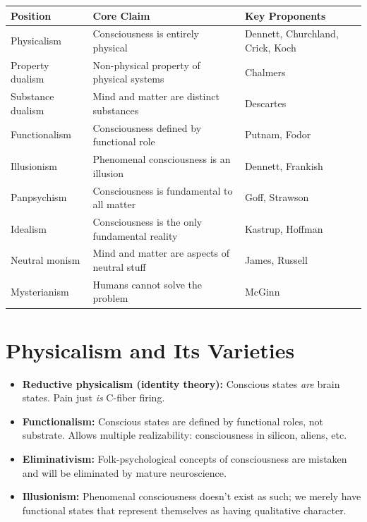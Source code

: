 \documentclass[11pt,a4paper]{report}
\begin{document}
\begin{center}
\renewcommand{\arraystretch}{1.3}
\begin{tabular}{>{\raggedright}p{3.5cm} >{\raggedright}p{4cm} >{\raggedright\arraybackslash}p{6cm}}
  \toprule
  \textbf{Position} & \textbf{Core Claim} & \textbf{Key Proponents} \\
  \midrule
  Physicalism & Consciousness is entirely physical & Dennett, Churchland, Crick, Koch \\
  Property dualism & Non-physical property of physical systems & Chalmers \\
  Substance dualism & Mind and matter are distinct substances & Descartes \\
  Functionalism & Consciousness defined by functional role & Putnam, Fodor \\
  Illusionism & Phenomenal consciousness is an illusion & Dennett, Frankish \\
  Panpsychism & Consciousness is fundamental to all matter & Goff, Strawson \\
  Idealism & Consciousness is the only fundamental reality & Kastrup, Hoffman \\
  Neutral monism & Mind and matter are aspects of neutral stuff & James, Russell \\
  Mysterianism & Humans cannot solve the problem & McGinn \\
  \bottomrule
\end{tabular}
\end{center}

\section{Physicalism and Its Varieties}

\begin{itemize}[leftmargin=1.5em]
  \item \textbf{Reductive physicalism (identity theory):} Conscious states \emph{are} brain states. Pain just \emph{is} C-fiber firing.
  \item \textbf{Functionalism:} Conscious states are defined by functional roles, not substrate. Allows multiple realizability: consciousness in silicon, aliens, etc.
  \item \textbf{Eliminativism:} Folk-psychological concepts of consciousness are mistaken and will be eliminated by mature neuroscience.
  \item \textbf{Illusionism:} Phenomenal consciousness doesn't exist as such; we merely have functional states that represent themselves as having qualitative character.
\end{itemize}
\end{document}

